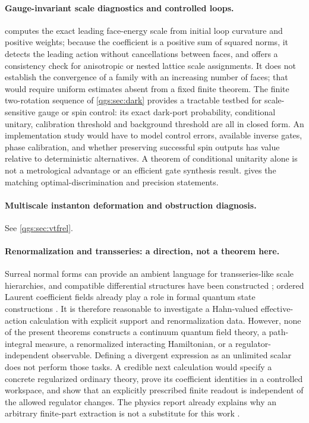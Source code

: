 \documentclass[11pt,oneside]{article}
\numberwithin{equation}{section}
\theoremstyle{plain}
\theoremstyle{definition}
\theoremstyle{remark}
\begin{document}
\paragraph{Gauge-invariant scale diagnostics and controlled loops.}
 computes the exact leading face-energy scale from initial loop curvature and positive weights; because the coefficient is a positive sum of squared norms, it detects the leading action without cancellations between faces, and offers a consistency check for anisotropic or nested lattice scale assignments. It does not establish the convergence of a family with an increasing number of faces; that would require uniform estimates absent from a fixed finite theorem. The finite two-rotation sequence of \cref{qgs:sec:dark} provides a tractable testbed for scale-sensitive gauge or spin control: its exact dark-port probability, conditional unitary, calibration threshold and background threshold are all in closed form. An implementation study would have to model control errors, available inverse gates, phase calibration, and whether preserving successful spin outputs has value relative to deterministic alternatives. A theorem of conditional unitarity alone is not a metrological advantage or an efficient gate synthesis result.  gives the matching optimal-discrimination and precision statements.

\paragraph{Multiscale instanton deformation and obstruction diagnosis.}
See \cref{qgs:sec:vtfrel}.

\paragraph{Renormalization and transseries: a direction, not a theorem here.}
Surreal normal forms can provide an ambient language for transseries-like scale hierarchies, and compatible differential structures have been constructed \cite{BM}; ordered Laurent coefficient fields already play a role in formal quantum state constructions \cite{BW}. It is therefore reasonable to investigate a Hahn-valued effective-action calculation with explicit support and renormalization data. However, none of the present theorems constructs a continuum quantum field theory, a path-integral measure, a renormalized interacting Hamiltonian, or a regulator-independent observable. Defining a divergent expression as an unlimited scalar does not perform those tasks. A credible next calculation would specify a concrete regularized ordinary theory, prove its coefficient identities in a controlled workspace, and show that an explicitly prescribed finite readout is independent of the allowed regulator changes. The physics report already explains why an arbitrary finite-part extraction is not a substitute for this work \cite{repoPhysics}.
\end{document}
